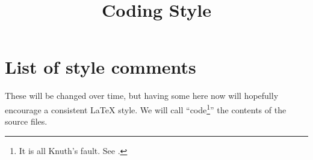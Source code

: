

%


\title{Coding Style}


\maketitle

\label{section-phantom}

\tableofcontents

\section{List of style comments}
\label{section-style}

\noindent
These will be changed over time, but having some here now
will hopefully encourage a consistent LaTeX style.
We will call ``code\footnote{It is all Knuth's fault. See \cite{Knuth}.}''
the contents of the source files.

